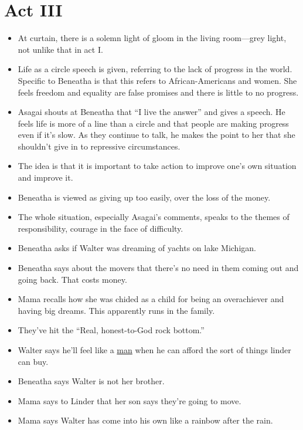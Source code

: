 \documentclass[11pt]{article}
\begin{document}
\section{Act III}
\begin{itemize}
	\item At curtain, there is a solemn light of gloom in the living room---grey
		light, not unlike that in act I.
	\item Life as a circle speech is given, referring to the lack of progress in
		the world.  Specific to Beneatha is that this refers to African-Americans
		and women.  She feels freedom and equality are false promises and there is
		little to no progress.
	\item Asagai shouts at Beneatha that ``I live the answer'' and gives a speech.
		He feels life is more of a line than a circle and that people are making
		progress even if it's slow.  As they continue to talk, he makes the point to
		her that she shouldn't give in to repressive circumstances.
	\item The idea is that it is important to take action to improve one's own 
		situation and improve it.
	\item Beneatha is viewed as giving up too easily, over the loss of the money.
	\item The whole situation, especially Asagai's comments, speaks to the themes
		of responsibility, courage in the face of difficulty.
	\item Beneatha asks if Walter was dreaming of yachts on lake Michigan.
	\item Beneatha says about the movers that there's no need in them coming out
		and going back.  That costs money.
	\item Mama recalls how she was chided as a child for being an overachiever and
		having big dreams.  This apparently runs in the family.
	\item They've hit the ``Real, honest-to-God rock bottom.'' 
	\item Walter says he'll feel like a \underline{man} when he can afford the
		sort of things linder can buy.
	\item Beneatha says Walter is not her brother.
	\item Mama says to Linder that her son says they're going to move.
	\item Mama says Walter has come into his own like a rainbow after the rain.
\end{itemize}
\end{document}
